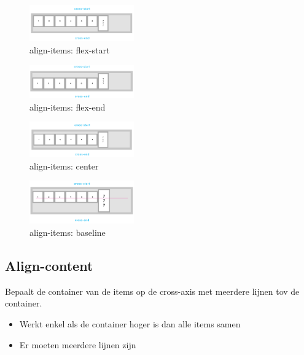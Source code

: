 \documentclass{article}
\begin{document}
\begin{figure}[H]
    \centering
    \includegraphics[width=0.4\textwidth]{img/Screenshot_20200427_094237.png}
    \caption{align-items: flex-start}
\end{figure}

\begin{figure}[H]
    \centering
    \includegraphics[width=0.4\textwidth]{img/Screenshot_20200427_094305.png}
    \caption{align-items: flex-end}
\end{figure}

\begin{figure}[H]
    \centering
    \includegraphics[width=0.4\textwidth]{img/Screenshot_20200427_094327.png}
    \caption{align-items: center}
\end{figure}

\begin{figure}[H]
    \centering
    \includegraphics[width=0.4\textwidth]{img/Screenshot_20200427_094349.png}
    \caption{align-items: baseline}
\end{figure}


\subsection{Align-content}

Bepaalt de container van de items op de cross-axis met meerdere lijnen tov de container.

\begin{itemize}
    \item Werkt enkel als de container hoger is dan alle items samen
    \item Er moeten meerdere lijnen zijn
\end{itemize}
\end{document}
